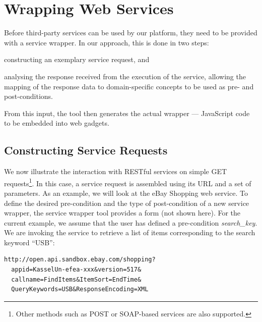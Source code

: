 
\section{Wrapping Web Services}
\label{sec:wrapping_web_services}

Before third-party services can be used by our platform, they need to be provided with a service wrapper. In our approach, this is done in two steps: 
\begin{inparaenum}[(i)]
	\item constructing an exemplary service request, and 
	\item analysing the response received from the execution of the service, allowing the mapping of the response data to domain-specific concepts to be used as pre- and post-conditions.
\end{inparaenum}
From this input, the tool then generates the actual wrapper --- JavaScript code to be embedded into web gadgets.

\subsection{Constructing Service Requests} %
\label{sub:constructing_service_requests}

We now illustrate the interaction with RESTful services on simple GET requests\footnote{Other methods such as POST or SOAP-based services are also supported.}. 
In this case, a service request is assembled using its URL and a set of parameters. As an example, we will look at the eBay Shopping web service. 
To define the desired pre-condition and the type of post-condition of a new service wrapper, the service wrapper tool provides a form (not shown here). For the current example, we assume that the user has defined a pre-condition \emph{search\_key}.
We are invoking the service to retrieve a list of items corresponding to the search keyword ``USB'':

\begin{lstlisting}
http://open.api.sandbox.ebay.com/shopping?
  appid=KasselUn-efea-xxx&version=517&
  callname=FindItems&ItemSort=EndTime&
  QueryKeywords=USB&ResponseEncoding=XML
\end{lstlisting}


